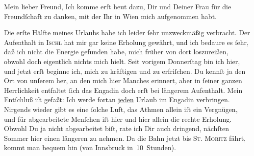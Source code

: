 \pstart\center{}Mein lieber Freund,\pend\vspace{0.5em}
\pstart
           Ich komme erſt heut dazu, Dir und Deiner Frau für die Freundſchaft zu
               danken, mit der Ihr in Wien mich aufgenommen
               habt.\pend
           
\pstart
           Die erſte Hälfte meines Urlaubs habe ich leider ſehr unzweckmäßig verbracht. Der
               Aufenthalt in \textsc{Ischl} hat mir gar keine Erholung gewährt, und ich bedaure {\pb}es ſehr, daß ich nicht die Energie gefunden habe, mich
               früher von dort loszureißen, obwohl doch eigentlich nichts mich hielt. Seit vorigem
                  Donnerſtag bin ich hier, und jetzt erſt beginne
               ich, mich zu kräftigen und zu erfriſchen. Du kennſt ja den Ort von unſerem \label{K_L03080-2v}\label{K_L03080-2} her, an den \strikeout{\textcolor{gray}{ich}} mich  hier Manches erinnert, aber in ſeiner ganzen Herrlichkeit entfaltet ſich das
                  Engadin doch erſt bei längerem Aufenthalt.
               Mein Entſchluß iſt gefaßt: Ich werde fortan \uline{jeden}
               Urlaub im Engadin verbringen. Nirgends wieder
               gibt es eine {\pb}ſolche Luft, das Athmen allein iſt ein
               Vergnügen, und für abgearbeitete Menſchen iſt hier und hier allein die rechte
               Erholung. Obwohl Du ja nicht abgearbeitet biſt, rate ich Dir auch dringend, nächſten
               Sommer hier einen längeren \label{K_L03080-3v}\label{K_L03080-3} zu nehmen. Da die
               Bahn jetzt bis \textsc{St. Moritz} fährt, kommt man bequem hin (von Innsbruck
               in 10 Stunden).\pend
           
